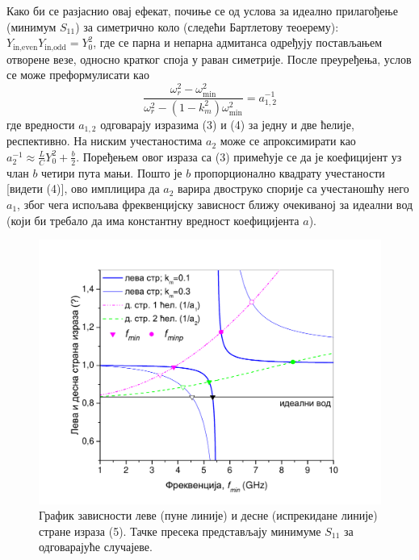 \documentclass[main.tex]{subfiles}
\begin{document}
Како би се разјаснио овај ефекат, почиње се од услова за идеално прилагођење (минимум $S_{11}$) за симетрично коло (следећи Бартлетову теоерему): $Y_\text{in,even} Y_\text{in,odd}=Y_0^2$, где се парна и непарна адмитанса одређују постављањем отворене везе, односно кратког споја у раван симетрије. После преуређења, услов се може преформулисати као
\begin{equation}
\frac{\omega_r^2 - \omega_\text{min}^2}{\omega_r^2-(1-k_m^2)\omega_\text{min}^2} =
a_{1,2}^{-1}
\end{equation}
где вредности $a_{1,2}$ одговарају изразима (3) и (4) за једну и две ћелије, респективно. На ниским учестаностима $a_2$ може се апроксимирати као $a_2^{-1} \approx
\frac{L}{C} Y_0^2 + \frac{b}{2}$. Поређењем овог израза са (3) примећује се да је коефицијент уз члан $b$ четири пута мањи. Пошто је $b$ пропорционално квадрату учестаности [видети (4)], ово имплицира да $a_2$ варира двоструко спорије са учестаношћу него $a_1$, због чега испољава фреквенцијску зависност ближу очекиваној за идеални вод (који би требало да има константну вредност коефицијента $a$). 
\begin{figure}[!t]
\centering
\includegraphics[width=\textwidth]{sl_ekv/fig5}
\caption{График зависности леве (пуне линије) и десне (испрекидане линије) стране израза (5). Тачке пресека представљају минимуме $S_{11}$ за одговарајуће случајеве.}
\label{f5}
\end{figure}
\end{document}
